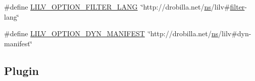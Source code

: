 \begin{DoxyCompactItemize}
\item 
\#define \hyperlink{group__lilv_ga01ba858cfabdfef1b74bdc2b7dad8f61}{L\+I\+L\+V\+\_\+\+O\+P\+T\+I\+O\+N\+\_\+\+F\+I\+L\+T\+E\+R\+\_\+\+L\+A\+NG}~\char`\"{}http\+://drobilla.\+net/\hyperlink{xmltok_8c_ab6aec1346fb6c7b2733f0f73c9536ad2}{ns}/lilv\#\hyperlink{record_8c_ac92bde2b71b52b0ec8a21906c4101b41}{filter}-\/lang\char`\"{}
\item 
\#define \hyperlink{group__lilv_gaf78470bbfb7422bac38ba51fe52911ed}{L\+I\+L\+V\+\_\+\+O\+P\+T\+I\+O\+N\+\_\+\+D\+Y\+N\+\_\+\+M\+A\+N\+I\+F\+E\+ST}~\char`\"{}http\+://drobilla.\+net/\hyperlink{xmltok_8c_ab6aec1346fb6c7b2733f0f73c9536ad2}{ns}/lilv\#dyn-\/manifest\char`\"{}
\end{DoxyCompactItemize}
\subsection*{Plugin}
